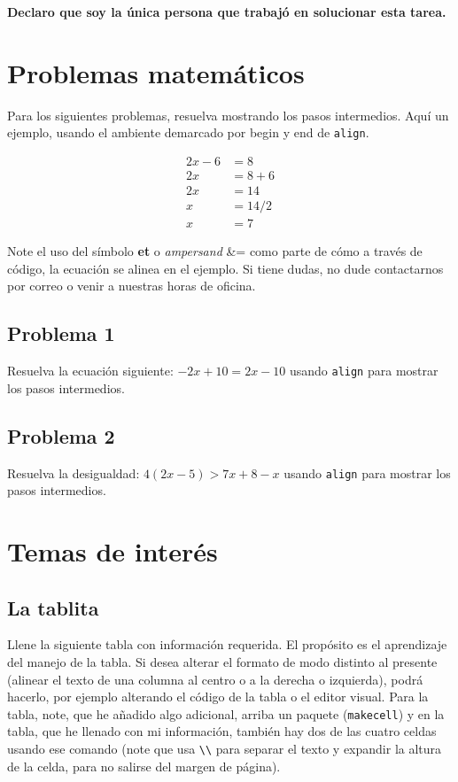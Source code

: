 \documentclass[11pt]{article} %
\begin{document}
\textbf{Declaro que soy la única persona que trabajó en solucionar esta tarea.}

\section{Problemas matemáticos}

Para los siguientes problemas, resuelva mostrando los pasos intermedios. Aquí un ejemplo, usando el ambiente demarcado por begin y end de \texttt{align}.

\begin{align*}
    2x - 6 &=  8 \\
    2x &= 8+6 \\
    2x &= 14 \\
    x &= 14/2 \\
    x &= 7
\end{align*}

Note el uso del símbolo \textbf{et} o \textit{ampersand} \&= como parte de cómo a través de código, la ecuación se alinea en el ejemplo. Si tiene dudas, no dude contactarnos por correo o venir a nuestras horas de oficina.

\subsection{Problema 1} 

Resuelva la ecuación siguiente: $-2x + 10 = 2x - 10$ usando \texttt{align} para mostrar los pasos intermedios.


\subsection{Problema 2} 

Resuelva la desigualdad: $4(2x - 5) > 7x + 8 - x$ usando \texttt{align} para mostrar los pasos intermedios.

\section{Temas de interés}

\subsection{La tablita}
Llene la siguiente tabla con información requerida. El propósito es el aprendizaje del manejo de la tabla. Si desea alterar el formato de modo distinto al presente (alinear el texto de una columna al centro o a la derecha o izquierda), podrá hacerlo, por ejemplo alterando el código de la tabla o el editor visual. Para la tabla, note, que he añadido algo adicional, arriba un paquete (\texttt{makecell}) y en la tabla, que he llenado con mi información, también hay dos de las cuatro celdas usando ese comando (note que usa \texttt{\textbackslash \textbackslash} para separar el texto y expandir la altura de la celda, para no salirse del margen de página).
\end{document}
